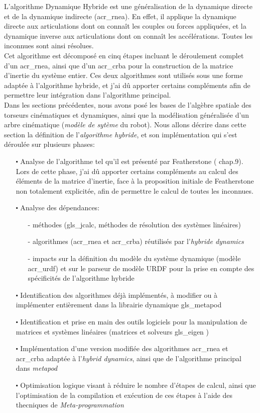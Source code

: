 \documentclass{report}
\begin{document}
L'algorithme Dynamique Hybride est une généralisation de la dynamique directe et de la dynamique indirecte (\gls{acr_rnea}). En effet, il applique la dynamique directe aux articulations dont on connaît les couples ou forces appliquées, et la dynamique inverse aux articulations dont on connaît les accélérations. Toutes les inconnues sont ainsi résolues.\\
Cet algorithme est décomposé en cinq étapes incluant le déroulement complet d'un \gls{acr_rnea}, ainsi que d'un \gls{acr_crba} pour la construction de la matrice d'inertie du système entier. Ces deux algorithmes sont utilisés sous une forme adaptée à l'algorithme hybride, et j'ai dû apporter certains compléments afin de permettre leur intégration dans l'algorithme principal.\\
Dans les sections précédentes, nous avons posé les bases de l'algèbre spatiale des torseurs cinématiques et dynamiques, ainsi que la modélisation généralisée d'un arbre cinématique (\emph{modèle de sytème} du robot). Nous allons décrire dans cette section la définition de l'\emph{algorithme hybride}, et son implémentation qui s'est déroulée sur plusieurs phases:\\
\begin{itemize}
  \item[$\centerdot$] Analyse de l'algorithme tel qu'il est présenté par Featherstone (\cite{bib_featherstone} chap.9). Lors de cette phase, j'ai dû apporter certains compléments au calcul des éléments de la matrice d'inertie, face à la proposition initiale de Featherstone non totalement explicitée, afin de permettre le calcul de toutes les inconnues.
  \item[$\centerdot$] Analyse des dépendances:
  \begin{itemize}
    \item[-] méthodes (\gls{gls_jcalc}, méthodes de résolution des systèmes linéaires)
    \item[-] algorithmes (\gls{acr_rnea} et \gls{acr_crba}) réutilisés par l'\emph{hybride dynamics}
    \item[-] impacts sur la définition du modèle du système dynamique (modèle \gls{acr_urdf}) et sur le parseur de modèle URDF pour la prise en compte des spécificités de l'algorithme hybride
  \end{itemize}
  \item[$\centerdot$] Identification des algorithmes déjà implémentés, à modifier ou à implémenter entièrement dans la librairie dynamique \gls{gls_metapod}
  \item[$\centerdot$] Identification et prise en main des outils logiciels pour la manipulation de matrices et systèmes linéaires (matrices et solveurs \gls{gls_eigen} \cite{bib_eigen})
  \item[$\centerdot$] Implémentation d'une version modifiée des algorithmes \gls{acr_rnea} et \gls{acr_crba} adaptée à l'\emph{hybrid dynamics}, ainsi que de l'algorithme principal dans \emph{metapod}
  \item[$\centerdot$] Optimisation logique visant à réduire le nombre d'étapes de calcul, ainsi que l'optimisation de la compilation et exécution de ces étapes à l'aide des thecniques de \emph{Meta-programmation}
\end{itemize}
\end{document}
